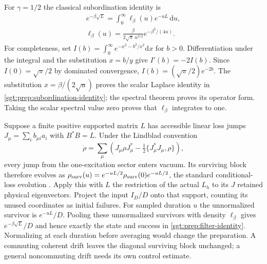 \documentclass[aps,pra,reprint,superscriptaddress,longbibliography]{revtex4-2}
\newcommand{\dd}{\mathrm d}
\begin{document}
For $\gamma=1/2$ the classical subordination identity
\cite{Garrigos2015} is
\begin{equation}
\begin{gathered}
 e^{-\beta\sqrt L}=\int_0^\infty\ell_\beta(u)e^{-uL}\,\dd u,
 \\
 \ell_\beta(u)=\frac{\beta}{2\sqrt\pi\,u^{3/2}}
              e^{-\beta^2/(4u)}.
 \label{sgt:prep:subordination-identity}
\end{gathered}
\end{equation}
For completeness, set
$I(b)=\int_0^\infty e^{-x^2-b^2/x^2}\dd x$ for $b>0$.
Differentiation under the integral and the substitution $x=b/y$
give $I'(b)=-2I(b)$. Since $I(0)=\sqrt\pi/2$ by dominated
convergence, $I(b)=(\sqrt\pi/2)e^{-2b}$.
The substitution $x=\beta/(2\sqrt u)$ proves the scalar Laplace
identity in \eqref{sgt:prep:subordination-identity}; the spectral
theorem proves its operator form. Taking the scalar spectral value
zero proves that $\ell_\beta$ integrates to one.

Suppose a finite positive supported matrix $L$ has accessible linear
loss jumps $J_\mu=\sum_i b_{\mu i}a_i$ with $B^*B=L$.
Under the Lindblad convention
\[
 \dot\rho=\sum_\mu
 \left(J_\mu\rho J_\mu^*
       -\tfrac12\{J_\mu^*J_\mu,\rho\}\right),
\]
every jump from the one-excitation sector enters vacuum. Its surviving
block therefore evolves as
$\rho_{\rm surv}(u)=e^{-uL/2}\rho_{\rm surv}(0)e^{-uL/2}$,
the standard conditional-loss evolution \cite{PlenioKnight1998}.
Apply this with $L$ the restriction of the actual $L_h$ to its $J$
retained physical eigenvectors. Project the input $I_D/D$ onto that
support, counting its unused coordinates as initial failures.
For sampled duration $u$ the unnormalized survivor is $e^{-uL}/D$.
Pooling these unnormalized survivors with density $\ell_\beta$
gives $e^{-\beta\sqrt L}/D$ and hence exactly the state and success
in \eqref{sgt:prep:filter-identity}. Normalizing at each duration
before averaging would change the preparation. A commuting coherent
drift leaves the diagonal surviving block unchanged; a general
noncommuting drift needs its own control estimate.
\end{document}
